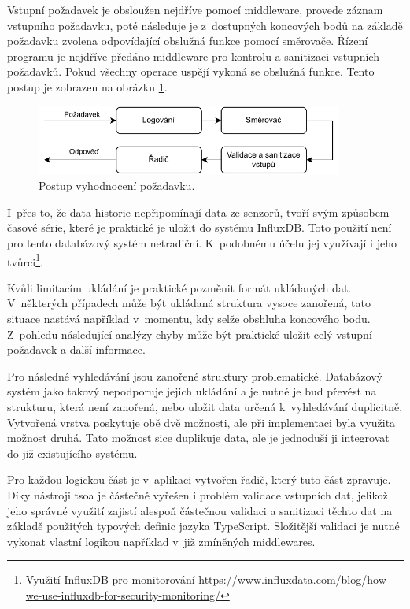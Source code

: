 Vstupní požadavek je obsloužen nejdříve pomocí middleware, provede záznam vstupního požadavku, poté následuje je z~dostupných koncových bodů na základě požadavku zvolena odpovídající obslužná funkce pomocí směrovače. Řízení programu je nejdříve předáno middleware pro kontrolu a sanitizaci vstupních požadavků. Pokud všechny operace uspějí vykoná se obslužná funkce. Tento postup je zobrazen na obrázku \ref{middlewares}.

\begin{figure}[H]
\label{middlewares}
\begin{center}
    \includegraphics[width=0.9\textwidth]{obrazky-figures/middleware2.pdf}
\end{center}
\caption{Postup vyhodnocení požadavku.}
\end{figure}

I~přes to, že data historie nepřipomínají data ze senzorů, tvoří svým způsobem časové série, které je praktické je uložit do systému InfluxDB. Toto použití není pro tento databázový systém netradiční. K~podobnému účelu jej využívají i jeho tvůrci\footnote{Využití InfluxDB pro monitorování \url{https://www.influxdata.com/blog/how-we-use-influxdb-for-security-monitoring/}}.

Kvůli limitacím ukládání je praktické pozměnit formát ukládaných dat. V~některých případech může být ukládaná struktura vysoce zanořená, tato situace nastává například v~momentu, kdy selže obshluha koncového bodu. Z~pohledu následující analýzy chyby může být praktické uložit celý vstupní požadavek a další informace.

Pro následné vyhledávání jsou zanořené struktury problematické. Databázový systém jako takový nepodporuje jejich ukládání a je nutné je buď převést na strukturu, která není zanořená, nebo uložit data určená k~vyhledávání duplicitně. Vytvořená vrstva poskytuje obě dvě možnosti, ale při implementaci byla využita možnost druhá. Tato možnost sice duplikuje data, ale je jednoduší ji integrovat do již existujícího systému.

Pro každou logickou část je v~aplikaci vytvořen řadič, který tuto část zpravuje. Díky nástroji tsoa je částečně vyřešen i problém validace vstupních dat, jelikož jeho správné využití zajistí alespoň částečnou validaci a sanitizaci těchto dat na základě použitých typových definic jazyka TypeScript. Složitější validaci je nutné vykonat vlastní logikou například v~již zmíněných middlewares.

